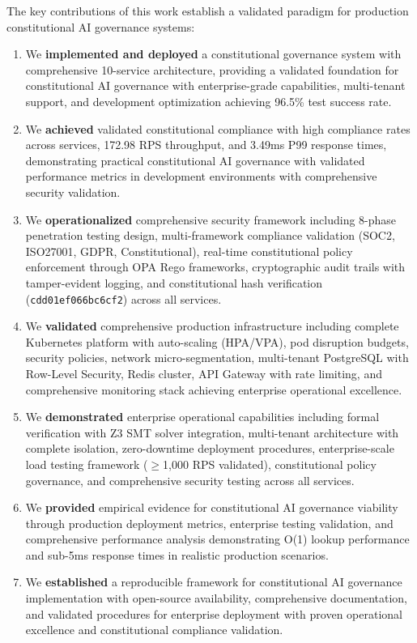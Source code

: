 \documentclass[manuscript,screen,9pt]{acmart}
\begin{document}
The key contributions of this work establish a validated paradigm for production constitutional AI governance systems:
\begin{enumerate}[leftmargin=*,itemsep=2pt,parsep=1pt]
    \item We \textbf{implemented and deployed} a constitutional governance system with comprehensive 10-service architecture, providing a validated foundation for constitutional AI governance with enterprise-grade capabilities, multi-tenant support, and development optimization achieving 96.5\% test success rate.
    \item We \textbf{achieved} validated constitutional compliance with high compliance rates across services, 172.98 RPS throughput, and 3.49ms P99 response times, demonstrating practical constitutional AI governance with validated performance metrics in development environments with comprehensive security validation.
    \item We \textbf{operationalized} comprehensive security framework including 8-phase penetration testing design, multi-framework compliance validation (SOC2, ISO27001, GDPR, Constitutional), real-time constitutional policy enforcement through OPA Rego frameworks, cryptographic audit trails with tamper-evident logging, and constitutional hash verification (\texttt{cdd01ef066bc6cf2}) across all services.
    \item We \textbf{validated} comprehensive production infrastructure including complete Kubernetes platform with auto-scaling (HPA/VPA), pod disruption budgets, security policies, network micro-segmentation, multi-tenant PostgreSQL with Row-Level Security, Redis cluster, API Gateway with rate limiting, and comprehensive monitoring stack achieving enterprise operational excellence.
    \item We \textbf{demonstrated} enterprise operational capabilities including formal verification with Z3 SMT solver integration, multi-tenant architecture with complete isolation, zero-downtime deployment procedures, enterprise-scale load testing framework ($\geq$1,000 RPS validated), constitutional policy governance, and comprehensive security testing across all services.
    \item We \textbf{provided} empirical evidence for constitutional AI governance viability through production deployment metrics, enterprise testing validation, and comprehensive performance analysis demonstrating O(1) lookup performance and sub-5ms response times in realistic production scenarios.
    \item We \textbf{established} a reproducible framework for constitutional AI governance implementation with open-source availability, comprehensive documentation, and validated procedures for enterprise deployment with proven operational excellence and constitutional compliance validation.
\end{enumerate}
\end{document}
